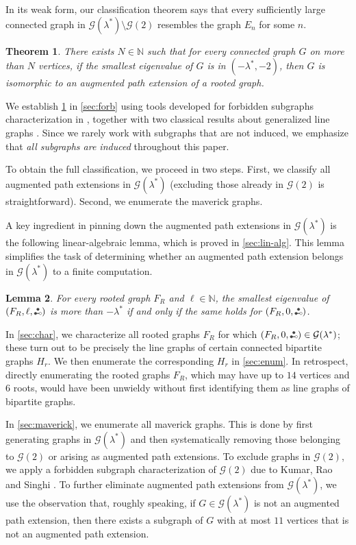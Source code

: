 \documentclass[11pt]{article}
\newtheorem{theorem}{Theorem}[section]
\newtheorem{lemma}[theorem]{Lemma}
\theoremstyle{definition}
\theoremstyle{remark}
\newcommand{\las}{\lambda^*}
\newcommand{\G}{\mathcal{G}}
\newcommand{\N}{\mathbb{N}}
\newcommand{\etwo}{\tikz[baseline=-0.2ex, scale=0.9]{\draw[darkgray, thick] (0,0)--(0.2,0); \draw[darkgray, fill=darkgray] (0,0) circle (0.05); \draw[darkgray, fill=darkgray] (0.1,0.17320508075) circle (0.05); \draw[darkgray, fill=white] (0.2,0) circle (0.05);}}
\newcommand{\ape}[1]{(#1,\etwo)}
\begin{document}
In its weak form, our classification theorem says that every sufficiently large connected graph in $\G(\las)\setminus \G(2)$ resembles the graph $E_n$ for some $n$.

\begin{theorem} \label{thm:main1}
    There exists $N \in \N$ such that for every connected graph $G$ on more than $N$ vertices, if the smallest eigenvalue of $G$ is in $(-\las, -2)$, then $G$ is isomorphic to an augmented path extension of a rooted graph.
\end{theorem}

We establish \cref{thm:main1} in \cref{sec:forb} using tools developed for forbidden subgraphs characterization in \cite{JP25}, together with two classical results about generalized line graphs \cite{CDS80,CDS81,H77b,RSV81}. Since we rarely work with subgraphs that are not induced, we emphasize that \emph{all subgraphs are induced} throughout this paper.

To obtain the full classification, we proceed in two steps. First, we classify all augmented path extensions in $\G(\las)$ (excluding those already in $\G(2)$ is straightforward). Second, we enumerate the maverick graphs.

A key ingredient in pinning down the augmented path extensions in $\G(\las)$ is the following linear-algebraic lemma, which is proved in \cref{sec:lin-alg}. This lemma simplifies the task of determining whether an augmented path extension belongs in $\G(\las)$ to a finite computation.

\begin{lemma} \label{thm:reduction}
    For every rooted graph $F_R$ and $\ell \in \N$, the smallest eigenvalue of $\ape{F_R,\ell}$ is more than $-\las$ if and only if the same holds for $\ape{F_R, 0}$.
\end{lemma}

In \cref{sec:char}, we characterize all rooted graphs $F_R$ for which $\ape{F_R,0} \in \G(\las)$; these turn out to be precisely the line graphs of certain connected bipartite graphs $H_r$. We then enumerate the corresponding $H_r$ in \cref{sec:enum}. In retrospect, directly enumerating the rooted graphs $F_R$, which may have up to $14$ vertices and $6$ roots, would have been unwieldy without first identifying them as line graphs of bipartite graphs.

In \cref{sec:maverick}, we enumerate all maverick graphs. This is done by first generating graphs in $\G(\las)$ and then systematically removing those belonging to $\G(2)$ or arising as augmented path extensions. To exclude graphs in $\G(2)$, we apply a forbidden subgraph characterization of $\G(2)$ due to Kumar, Rao and Singhi \cite{KRS82}. To further eliminate augmented path extensions from $\G(\las)$, we use the observation that, roughly speaking, if $G \in \G(\las)$ is not an augmented path extension, then there exists a subgraph of $G$ with at most $11$ vertices that is not an augmented path extension.
\end{document}
